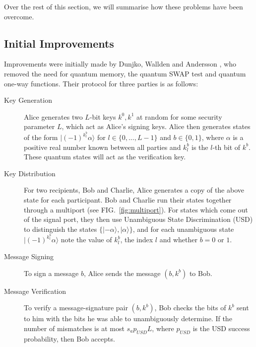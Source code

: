 \documentclass[%
 reprint,
 amsmath,amssymb,
 aps,
 pra,
]{revtex4-1}
\begin{document}
Over the rest of this section, we will summarise how these problems have been overcome.

\subsection{Initial Improvements}
\label{ssec:no-qmem}

Improvements were initially made by Dunjko, Wallden and Andersson \cite{PhysRevLett.112.040502}, who removed the need for quantum memory, the quantum SWAP test and quantum one-way functions. Their protocol for three parties is as follows:

\begin{description}
\item[Key Generation]Alice generates two $L$-bit keys $k^0, k^1$ at random for some security parameter $L$, which act as Alice's signing keys. Alice then generates states of the form $|(-1)^{k^b_l}\alpha\rangle$ for $l \in \{0,...,L-1\}$ and $b \in \{0, 1\}$, where $\alpha$ is a positive real number known between all parties and $k^b_l$ is the $l$-th bit of $k^b$. These quantum states will act as the verification key.
\item[Key Distribution]For two recipients, Bob and Charlie, Alice generates a copy of the above state for each participant. Bob and Charlie run their states together through a multiport (see FIG.\ \ref{fig:multiport}). For states which come out of the signal port, they then use Unambiguous State Discrimination (USD) \cite{Ivanovic1987257} to distinguish the states $\{|-\alpha\rangle, |\alpha\rangle\}$, and for each unambiguous state $|(-1)^{k^b_l}\alpha\rangle$ note the value of $k^b_l$, the index $l$ and whether $b = 0$ or $1$.
\item[Message Signing]To sign a message $b$, Alice sends the message $(b, k^b)$ to Bob.
\item[Message Verification]To verify a message-signature pair $(b, k^b)$, Bob checks the bits of $k^b$ sent to him with the bits he was able to unambiguously determine. If the number of mismatches is at most $s_ap_{USD}L$, where $p_{USD}$ is the USD success probability, then Bob accepts.
\end{description}
\end{document}

